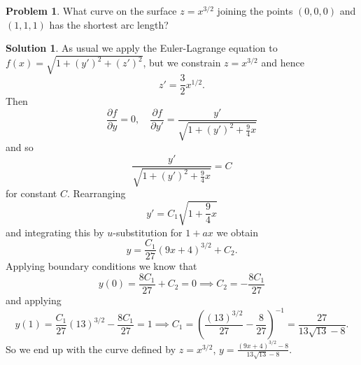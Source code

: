 \documentclass[10pt]{article}
\theoremstyle{definition}
\newtheorem{problem}{Problem}
\newtheorem{soln}{Solution}
\begin{document}
\begin{problem} What curve on the surface $z=x^{3/2}$ joining the points $(0,0,0)$ and $(1,1,1)$ has the shortest arc
length?
\end{problem}
\begin{soln}
  As usual we apply the Euler-Lagrange equation to $f(x)=\sqrt{1+(y')^2+(z')^2}$, but we constrain $z=x^{3/2}$ and hence $$z'=\frac{3}{2}x^{1/2}.$$
  Then
  $$\frac{\partial f}{\partial y}=0,\quad \frac{\partial f}{\partial y'}=\frac{y'}{\sqrt{1+(y')^2+\frac{9}{4}x}}$$
  and so
  $$\frac{y'}{\sqrt{1+(y')^2+\frac{9}{4}x}}=C$$
  for constant $C$. Rearranging
  $$y'=C_1\sqrt{1+\frac{9}{4}x}$$
  and integrating this by $u$-substitution for $1+ax$ we obtain
  $$y=\frac{C_1}{27}(9x + 4)^{3/2}+C_2.$$
  Applying boundary conditions we know that
  $$y(0)=\frac{8C_1}{27}+C_2=0\implies C_2=-\frac{8C_1}{27}$$
  and applying
  $$y(1)=\frac{C_1}{27}(13)^{3/2}-\frac{8C_1}{27}=1\implies C_1=\left(\frac{(13)^{3/2}}{27}-\frac{8}{27}\right)^{-1}=\frac{27}{13\sqrt{13}-8}.$$
  So we end up with the curve defined by $z=x^{3/2}$, $y=\frac{(9x + 4)^{3/2}-8}{13\sqrt{13}-8}$.
\end{soln}
\end{document}
